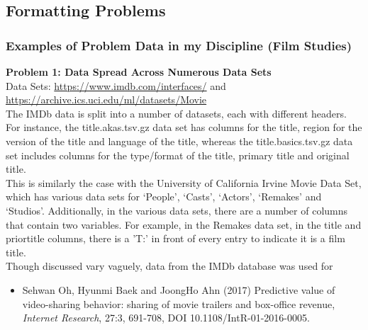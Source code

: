 \documentclass{article}
\begin{document}
\begin{FlushLeft}
\subsection{Formatting Problems}
\subsubsection*{Examples of Problem Data in my Discipline (Film Studies) }
\textbf{Problem 1: Data Spread Across Numerous Data Sets}\\
Data Sets: \url{https://www.imdb.com/interfaces/} and \url{https://archive.ics.uci.edu/ml/datasets/Movie}\\
The IMDb data is split into a number of datasets, each with different headers. For instance, the title.akas.tsv.gz data set has columns for the title, region for the version of the title and language of the title, whereas the title.basics.tsv.gz data set includes columns for the type/format of the title, primary title and original title.\\
This is similarly the case with the University of California Irvine Movie Data Set, which has various data sets for ‘People’, ‘Casts’, ‘Actors’, ‘Remakes’ and ‘Studios’. Additionally, in the various data sets, there are a number of columns that contain two variables. For example, in the Remakes data set, in the title and priortitle columns, there is a ’T:’ in front of every entry to indicate it is a film title.\\
Though discussed vary vaguely, data from the IMDb database was used for\\
\begin{itemize}
\item Sehwan Oh, Hyunmi Baek and JoongHo Ahn (2017) Predictive value of video-sharing behavior: sharing of movie trailers and box-office revenue, \textit{Internet Research}, 27:3, 691-708, DOI 10.1108/IntR-01-2016-0005.
\end{itemize}


\end{FlushLeft}
\end{document}
